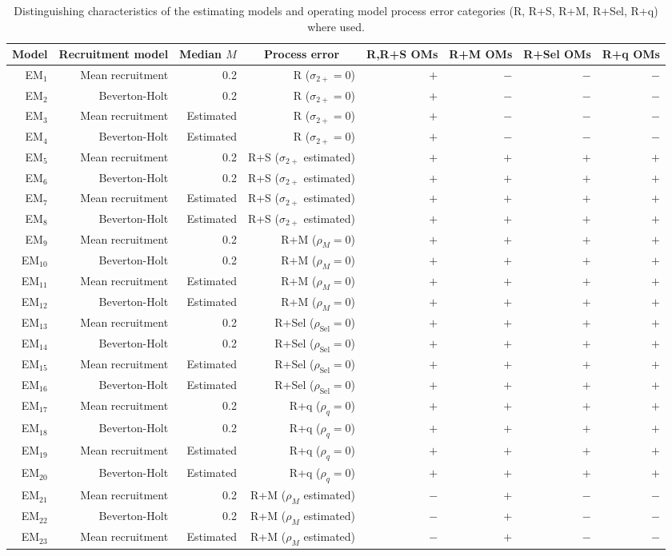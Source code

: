 \documentclass[
  12pt,
]{article}
\begin{document}
\begin{table}
\caption{Distinguishing characteristics of the estimating models and operating model process error categories (R, R+S, R+M, R+Sel, R+q) where used.}\label{em_table}
{\scriptsize \begin{center}
\begin{tabular}{rrrrrrrr}
\hline\hline
\multicolumn{1}{c}{Model}&\multicolumn{1}{c}{Recruitment model}&\multicolumn{1}{c}{Median $M$}&\multicolumn{1}{c}{Process error}&\multicolumn{1}{c}{R,R+S OMs}&\multicolumn{1}{c}{R+M OMs}&\multicolumn{1}{c}{R+Sel OMs}&\multicolumn{1}{c}{R+q OMs}\tabularnewline
\hline
EM$_{1}$&Mean recruitment&0.2&R ($\sigma_{2+} = 0$)&$+$&$-$&$-$&$-$\tabularnewline
EM$_{2}$&Beverton-Holt&0.2&R ($\sigma_{2+} = 0$)&$+$&$-$&$-$&$-$\tabularnewline
EM$_{3}$&Mean recruitment&Estimated&R ($\sigma_{2+} = 0$)&$+$&$-$&$-$&$-$\tabularnewline
EM$_{4}$&Beverton-Holt&Estimated&R ($\sigma_{2+} = 0$)&$+$&$-$&$-$&$-$\tabularnewline
EM$_{5}$&Mean recruitment&0.2&R+S ($\sigma_{2+}$ estimated)&$+$&$+$&$+$&$+$\tabularnewline
EM$_{6}$&Beverton-Holt&0.2&R+S ($\sigma_{2+}$ estimated)&$+$&$+$&$+$&$+$\tabularnewline
EM$_{7}$&Mean recruitment&Estimated&R+S ($\sigma_{2+}$ estimated)&$+$&$+$&$+$&$+$\tabularnewline
EM$_{8}$&Beverton-Holt&Estimated&R+S ($\sigma_{2+}$ estimated)&$+$&$+$&$+$&$+$\tabularnewline
EM$_{9}$&Mean recruitment&0.2&R+M ($\rho_{M} = 0$)&$+$&$+$&$+$&$+$\tabularnewline
EM$_{10}$&Beverton-Holt&0.2&R+M ($\rho_{M} = 0$)&$+$&$+$&$+$&$+$\tabularnewline
EM$_{11}$&Mean recruitment&Estimated&R+M ($\rho_{M} = 0$)&$+$&$+$&$+$&$+$\tabularnewline
EM$_{12}$&Beverton-Holt&Estimated&R+M ($\rho_{M} = 0$)&$+$&$+$&$+$&$+$\tabularnewline
EM$_{13}$&Mean recruitment&0.2&R+Sel ($\rho_{\text{Sel}} = 0$)&$+$&$+$&$+$&$+$\tabularnewline
EM$_{14}$&Beverton-Holt&0.2&R+Sel ($\rho_{\text{Sel}} = 0$)&$+$&$+$&$+$&$+$\tabularnewline
EM$_{15}$&Mean recruitment&Estimated&R+Sel ($\rho_{\text{Sel}} = 0$)&$+$&$+$&$+$&$+$\tabularnewline
EM$_{16}$&Beverton-Holt&Estimated&R+Sel ($\rho_{\text{Sel}} = 0$)&$+$&$+$&$+$&$+$\tabularnewline
EM$_{17}$&Mean recruitment&0.2&R+q ($\rho_{q} = 0$)&$+$&$+$&$+$&$+$\tabularnewline
EM$_{18}$&Beverton-Holt&0.2&R+q ($\rho_{q} = 0$)&$+$&$+$&$+$&$+$\tabularnewline
EM$_{19}$&Mean recruitment&Estimated&R+q ($\rho_{q} = 0$)&$+$&$+$&$+$&$+$\tabularnewline
EM$_{20}$&Beverton-Holt&Estimated&R+q ($\rho_{q} = 0$)&$+$&$+$&$+$&$+$\tabularnewline
EM$_{21}$&Mean recruitment&0.2&R+M ($\rho_{M}$ estimated)&$-$&$+$&$-$&$-$\tabularnewline
EM$_{22}$&Beverton-Holt&0.2&R+M ($\rho_{M}$ estimated)&$-$&$+$&$-$&$-$\tabularnewline
EM$_{23}$&Mean recruitment&Estimated&R+M ($\rho_{M}$ estimated)&$-$&$+$&$-$&$-$\tabularnewline

\end{tabular}
\end{center}}
\end{table}
\end{document}
